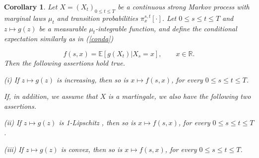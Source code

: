 \documentclass[11pt,a4paper]{article}%
\def\E{{\mathbb E}}
\def\R{{\mathbb R}}
\newtheorem{corollary}[theorem]{Corollary}
\numberwithin{equation}{section}
\begin{document}
\begin{corollary}\label{corr}
Let $X = (X_t)_{0 \le t \le T}$ be a continuous strong Markov process with marginal laws $\mu_t$ and transition probabilities $\pi_x^{s,t}[ \cdot]$. Let $0 \le s \le t \le T$  and $z \mapsto g(z)$ be a measurable $\mu_t$-integrable function, and define the conditional expectation similarly as in (\ref{conda})

\begin{equation} \label {condad}
f(s,x) = \E [g(X_t)|X_s=x],   \qquad  x \in \R.
\end{equation}
Then the following assertions hold true.

(i) If $z \mapsto g(z)$ is increasing, then so is $x \mapsto f(s,x)$, for every $0 \le s \le t \le T$.

\noindent If, in addition, we assume that $X$ is a martingale, we also have the following two assertions.

(ii) If $z \mapsto g(z)$ is 1-Lipschitz , then so is $x \mapsto f(s,x)$, for every $0 \le s \le t \le T$.

(iii) If $z \mapsto g(z)$ is convex, then so is $x \mapsto f(s,x)$, for every $0 \le s \le t \le T$.



\end{corollary}
\end{document}
